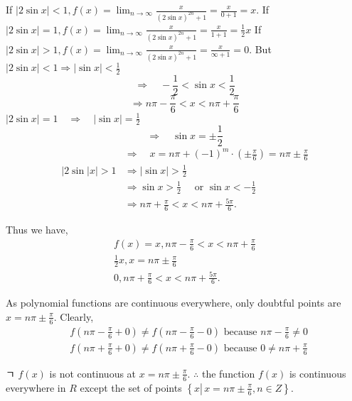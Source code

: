 \begin{enumerate}
If $|2 \sin x|<1, f(x)=\lim _{n \rightarrow \infty} \frac{x}{(2 \sin x)^{2 n}+1}=\frac{x}{0+1}=x$.
If $|2 \sin x|=1, f(x)=\lim _{n \rightarrow \infty} \frac{x}{(2 \sin x)^{2 n}+1}=\frac{x}{1+1}=\frac{1}{2} x$
If $|2 \sin x|>1, f(x)=\lim _{n \rightarrow \infty} \frac{x}{(2 \sin x)^{2 n}+1}=\frac{x}{\infty+1}=0$.
But $|2 \sin x|<1 \Rightarrow|\sin x|<\frac{1}{2}$
$$
\Rightarrow \quad-\frac{1}{2}<\sin x<\frac{1}{2}
$$
$$
\Rightarrow n \pi-\frac{\pi}{6}<x<n \pi+\frac{\pi}{6}
$$
$|2 \sin x|=1 \quad \Rightarrow \quad|\sin x|=\frac{1}{2}$
$$
\Rightarrow \quad \sin x= \pm \frac{1}{2}
$$
$$
\begin{aligned}
& \Rightarrow \quad x=n \pi+(-1)^m \cdot\left( \pm \frac{\pi}{6}\right)=n \pi \pm \frac{\pi}{6} \\
|2 \sin | x \mid>1 & \Rightarrow|\sin x|>\frac{1}{2} \\
& \Rightarrow \sin x>\frac{1}{2} \quad \text { or } \sin x<-\frac{1}{2} \\
& \Rightarrow n \pi+\frac{\pi}{6}<x<n \pi+\frac{5 \pi}{6} .
\end{aligned}
$$

Thus we have,
$$
\begin{gathered}
f(x)=x, n \pi-\frac{\pi}{6}<x<n \pi+\frac{\pi}{6} \\
\frac{1}{2} x, x=n \pi \pm \frac{\pi}{6} \\
0, n \pi+\frac{\pi}{6}<x<n \pi+\frac{5 \pi}{6} .
\end{gathered}
$$

As polynomial functions are continuous everywhere, only doubtful points are $x=n \pi \pm \frac{\pi}{6}$. Clearly,
$$
\begin{aligned}
& f\left(n \pi-\frac{\pi}{6}+0\right) \neq f\left(n \pi-\frac{\pi}{6}-0\right) \text { because } n \pi-\frac{\pi}{6} \neq 0 \\
& f\left(n \pi+\frac{\pi}{6}+0\right) \neq f\left(n \pi+\frac{\pi}{6}-0\right) \text { because } 0 \neq n \pi+\frac{\pi}{6}
\end{aligned}
$$

ㄱ $f(x)$ is not continuous at $x=n \pi \pm \frac{\pi}{6}$.
$\therefore$ the function $f(x)$ is continuous everywhere in $R$ except the set of points $\left\{x \left\lvert\, x=n \pi \pm \frac{\pi}{6}\right., n \in Z\right\}$.
\end{enumerate}


















